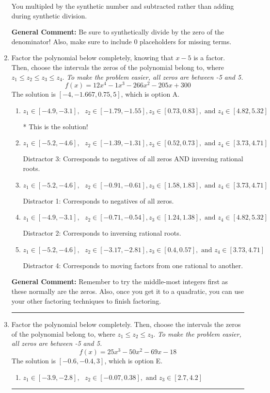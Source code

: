 \documentclass{extbook}[14pt]
\newcommand{\litem}[1]{\item #1

\rule{\textwidth}{0.4pt}}
\begin{document}
\begin{enumerate}
{\begin{enumerate}[label=\Alph*.]
 You multipled by the synthetic number and subtracted rather than adding during synthetic division.
\end{enumerate}

\textbf{General Comment:} Be sure to synthetically divide by the zero of the denominator! Also, make sure to include 0 placeholders for missing terms.
}
\litem{
Factor the polynomial below completely, knowing that $x -5$ is a factor. Then, choose the intervals the zeros of the polynomial belong to, where $z_1 \leq z_2 \leq z_3 \leq z_4$. \textit{To make the problem easier, all zeros are between -5 and 5.}
\[ f(x) = 12x^{4} -1 x^{3} -266 x^{2} -205 x + 300 \]The solution is \( [-4, -1.667, 0.75, 5] \), which is option A.\begin{enumerate}[label=\Alph*.]
\item \( z_1 \in [-4.9, -3.1], \text{   }  z_2 \in [-1.79, -1.55], z_3 \in [0.73, 0.83], \text{   and   } z_4 \in [4.82, 5.32] \)

* This is the solution!
\item \( z_1 \in [-5.2, -4.6], \text{   }  z_2 \in [-1.39, -1.31], z_3 \in [0.52, 0.73], \text{   and   } z_4 \in [3.73, 4.71] \)

 Distractor 3: Corresponds to negatives of all zeros AND inversing rational roots.
\item \( z_1 \in [-5.2, -4.6], \text{   }  z_2 \in [-0.91, -0.61], z_3 \in [1.58, 1.83], \text{   and   } z_4 \in [3.73, 4.71] \)

 Distractor 1: Corresponds to negatives of all zeros.
\item \( z_1 \in [-4.9, -3.1], \text{   }  z_2 \in [-0.71, -0.54], z_3 \in [1.24, 1.38], \text{   and   } z_4 \in [4.82, 5.32] \)

 Distractor 2: Corresponds to inversing rational roots.
\item \( z_1 \in [-5.2, -4.6], \text{   }  z_2 \in [-3.17, -2.81], z_3 \in [0.4, 0.57], \text{   and   } z_4 \in [3.73, 4.71] \)

 Distractor 4: Corresponds to moving factors from one rational to another.
\end{enumerate}

\textbf{General Comment:} Remember to try the middle-most integers first as these normally are the zeros. Also, once you get it to a quadratic, you can use your other factoring techniques to finish factoring.
}
\litem{
Factor the polynomial below completely. Then, choose the intervals the zeros of the polynomial belong to, where $z_1 \leq z_2 \leq z_3$. \textit{To make the problem easier, all zeros are between -5 and 5.}
\[ f(x) = 25x^{3} -50 x^{2} -69 x -18 \]The solution is \( [-0.6, -0.4, 3] \), which is option E.\begin{enumerate}[label=\Alph*.]
\item \( z_1 \in [-3.9, -2.8], \text{   }  z_2 \in [-0.07, 0.38], \text{   and   } z_3 \in [2.7, 4.2] \)


\end{enumerate}}
\end{enumerate}
\end{document}
